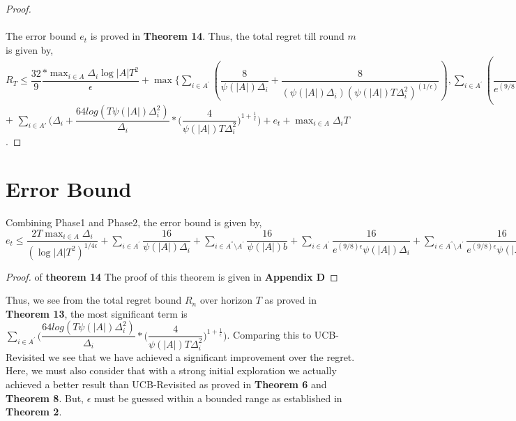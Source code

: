 \begin{proof}
\paragraph*{}The error bound $e_{t}$ is proved in \textbf{Theorem 14}.
\newline
Thus, the total regret till round $m$ is given by,
$R_{T}\leq \dfrac{32}{9}\dfrac{ * \max_{i\in A}{\Delta}_{i} \log |A|T^{2}}{\epsilon} + \max\bigg\lbrace\sum_{i\in A^{'}} (\dfrac{8}{\psi(|A|)\Delta_{i}} + \dfrac{8}{(\psi(|A|)\Delta_{i})(\psi(|A|)T\Delta_{i}^{2})^{(1/\epsilon)}}), \sum_{i\in A^{'}}(\dfrac{8}{ e^{(9/8)\epsilon} \psi(|A|)\Delta_{i}} + \dfrac{8}{(e^{(9/8)\epsilon}(\psi(|A|)\Delta_{i})(e^{(9/8)\epsilon} \psi(|A|)T\Delta_{i}^{2})^{(1/\epsilon)}})\bigg\rbrace$
\newline + $\sum_{i\in A'}\bigg(\Delta_{i} + \dfrac{64log({T\psi(|A|)\Delta_{i}^{2}})}{\Delta_{i}}*\bigg(\dfrac{4}{\psi(|A|)T\Delta_{i}^{2}}\bigg)^{1+\frac{1}{\epsilon}}\bigg) + e_{t} + \max_{i\in A}\Delta_{i}T$.
\end{proof}

\section{Error Bound}
\begin{theorem}
Combining Phase1 and Phase2, the error bound is given by, $e_{t}\leq \dfrac{2T\max_{i\in A}{\Delta_{i}}}{(\log |A|T^{2})^{1/4\epsilon}} + \sum_{i\in A^{'}}\dfrac{16}{\psi(|A|)\Delta_{i}}+\sum_{i\in A^{''}\setminus A^{'}}\dfrac{16}{\psi(|A|)b}+
\sum_{i\in A^{'}}\dfrac{16}{e^{(9/8)\epsilon}\psi(|A|)\Delta_{i}}+\sum_{i\in A^{''}\setminus A^{'}}\dfrac{16}{e^{(9/8)\epsilon}\psi(|A|)b}$
\end{theorem}

\begin{proof} of \textbf{theorem 14}
\newline
The proof of this theorem is given in \textbf{Appendix D}
\end{proof}

Thus, we see from the total regret bound $R_{n}$ over horizon $T$ as proved in \textbf{Theorem 13}, the most significant term is $\sum_{i\in A^{'}}\bigg(\dfrac{64log({T\psi(|A|)\Delta_{i}^{2}})}{\Delta_{i}}*\bigg(\dfrac{4}{\psi(|A|)T\Delta_{i}^{2}}\bigg)^{1+\frac{1}{\epsilon}}\bigg)$. Comparing this to UCB-Revisited we see that we have achieved a significant improvement over the regret. Here, we must also consider that with a strong initial exploration we actually achieved a better result than UCB-Revisited as proved in \textbf{Theorem 6} and \textbf{Theorem 8}. But, $\epsilon$ must be guessed within a bounded range as established in \textbf{Theorem 2}.